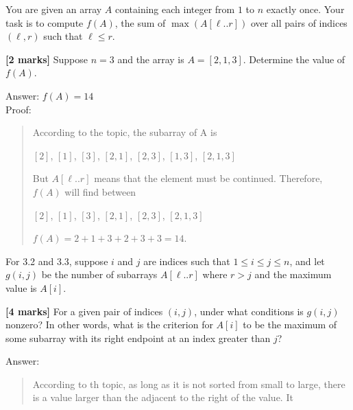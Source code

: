 \documentclass{article}
\begin{document}
\setcounter{question}{2}

\begin{Question}
You are given an array $A$ containing each integer from $1$ to $n$ exactly once. Your task is to compute $f(A)$, the sum of $\max(A[\ell..r])$ over all pairs of indices $(\ell,r)$ such that $\ell \le r$.

\begin{Subquestion}
\textbf{[2 marks]} Suppose $n = 3$ and the array is $A = [2,1,3]$. Determine the value of $f(A)$.

\begin{answer}
Answer: $f(A) = 14$\\
Proof:
\begin{quote}
    According to the topic, the subarray of A is 
    \begin{center}
        $[2]$, $[1]$, $[3]$, $[2, 1]$, $[2, 3]$, $[1, 3]$, $[2, 1, 3]$
    \end{center}
    But $A[\ell..r]$ means that the element must be continued. Therefore, $f(A)$ will find between
    \begin{center}
        $[2]$, $[1]$, $[3]$, $[2, 1]$, $[2, 3]$, $[2, 1, 3]$
    \end{center}
    $f(A) = 2 + 1 + 3 + 2 + 3 + 3 = 14$.\\
\end{quote}
\end{answer}
\end{Subquestion}

For 3.2 and 3.3, suppose $i$ and $j$ are indices such that $1 \le i \le j \le n$, and let $g(i,j)$ be the number of subarrays $A[\ell..r]$ where $r > j$ and the maximum value is $A[i]$.

\begin{Subquestion}\label{identify-max}
\textbf{[4 marks]} For a given pair of indices $(i,j)$, under what conditions is $g(i,j)$ nonzero? In other words, what is the criterion for $A[i]$ to be the maximum of some subarray with its right endpoint at an index greater than $j$?

\begin{answer}
Answer:
\begin{quote}
    According to th topic, as long as it is not sorted from small to large, there is a value larger than the adjacent to the right of the value. It \\
\end{quote}
\end{answer}
\end{Subquestion}


\end{Question}
\end{document}
